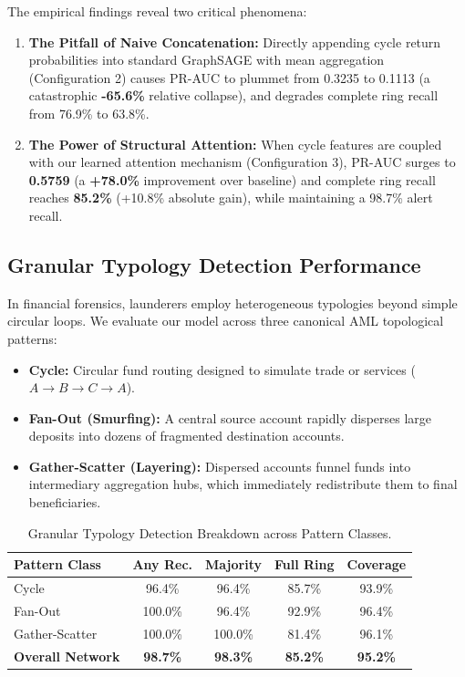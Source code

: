 \documentclass[10pt,twocolumn]{article}
\begin{document}
The empirical findings reveal two critical phenomena:
\begin{enumerate}
    \item \textbf{The Pitfall of Naive Concatenation:} Directly appending cycle return probabilities into standard GraphSAGE with mean aggregation (Configuration 2) causes PR-AUC to plummet from 0.3235 to 0.1113 (a catastrophic \textbf{-65.6\%} relative collapse), and degrades complete ring recall from 76.9\% to 63.8\%.
    \item \textbf{The Power of Structural Attention:} When cycle features are coupled with our learned attention mechanism (Configuration 3), PR-AUC surges to \textbf{0.5759} (a \textbf{+78.0\%} improvement over baseline) and complete ring recall reaches \textbf{85.2\%} (+10.8\% absolute gain), while maintaining a 98.7\% alert recall.
\end{enumerate}

\subsection{Granular Typology Detection Performance}
In financial forensics, launderers employ heterogeneous typologies beyond simple circular loops. We evaluate our model across three canonical AML topological patterns:
\begin{itemize}
    \item \textbf{Cycle:} Circular fund routing designed to simulate trade or services ($A \rightarrow B \rightarrow C \rightarrow A$).
    \item \textbf{Fan-Out (Smurfing):} A central source account rapidly disperses large deposits into dozens of fragmented destination accounts.
    \item \textbf{Gather-Scatter (Layering):} Dispersed accounts funnel funds into intermediary aggregation hubs, which immediately redistribute them to final beneficiaries.
\end{itemize}

\begin{table}[ht]
\centering
\caption{Granular Typology Detection Breakdown across Pattern Classes.}
\label{tab:typology}
\small
\renewcommand{\arraystretch}{1.15}
\begin{tabularx}{\columnwidth}{Xcccc}
\toprule
\textbf{Pattern Class} & \textbf{Any Rec.} & \textbf{Majority} & \textbf{Full Ring} & \textbf{Coverage} \\
\midrule
Cycle & 96.4\% & 96.4\% & 85.7\% & 93.9\% \\
Fan-Out & 100.0\% & 96.4\% & 92.9\% & 96.4\% \\
Gather-Scatter & 100.0\% & 100.0\% & 81.4\% & 96.1\% \\
\midrule
\textbf{Overall Network} & \textbf{98.7\%} & \textbf{98.3\%} & \textbf{85.2\%} & \textbf{95.2\%} \\
\bottomrule
\end{tabularx}
\end{table}
\end{document}
